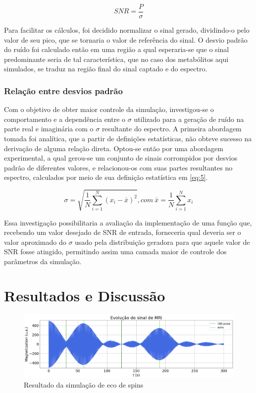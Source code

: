 \documentclass{article}
\begin{document}
\begin{equation} \label{eq:2}
    SNR = \frac{P}{\sigma}
\end{equation}

Para facilitar os cálculos, foi decidido normalizar o sinal gerado, dividindo-o pelo valor de seu pico, que se tornaria o valor de referência do sinal. O desvio padrão do ruído foi 
calculado então em uma região a qual esperaria-se que o sinal predominante seria de tal característica, que no caso dos metabólitos aqui simulados, se traduz na região final do sinal captado e do espectro.

\subsubsection{Relação entre desvios padrão}

Com o objetivo de obter maior controle da simulação, investigou-se o comportamento e a dependência entre o $\sigma$ utilizado para a geração de ruído na parte real e imaginária com o $\sigma$ resultante do espectro. A primeira abordagem 
tomada foi analítica, que a partir de definições estatísticas, não obteve sucesso na derivação de alguma relação direta. Optou-se então por uma abordagem experimental, a qual gerou-se um conjunto de sinais 
corrompidos por desvios padrão de diferentes valores, e relacionou-os com suas partes resultantes no espectro, calculados por meio de sua definição 
estatística em \ref{eq:5}.

\begin{equation} \label{eq:5}
    \sigma = \sqrt{\frac{1}{N} \sum_{i=1}^{N} (x_i - \bar{x})^2}, com \ \bar{x} = \frac{1}{N} \sum_{i = 1}^{N} x_i  
\end{equation}

Essa investigação possibilitaria a avaliação da implementação de uma função que, recebendo um valor desejado de SNR de entrada, forneceria qual deveria ser o valor aproximado do $\sigma$ usado pela distribuição 
geradora para que aquele valor de SNR fosse atingido, permitindo assim uma camada maior de controle dos parâmetros da simulação.



\section{Resultados e Discussão}

\begin{figure} [H]
    \includegraphics[scale=0.28]{spin-echo-example.png}
    \caption{Resultado da simulação de eco de spins}
    \label{fig:3}
\end{figure}
\end{document}
